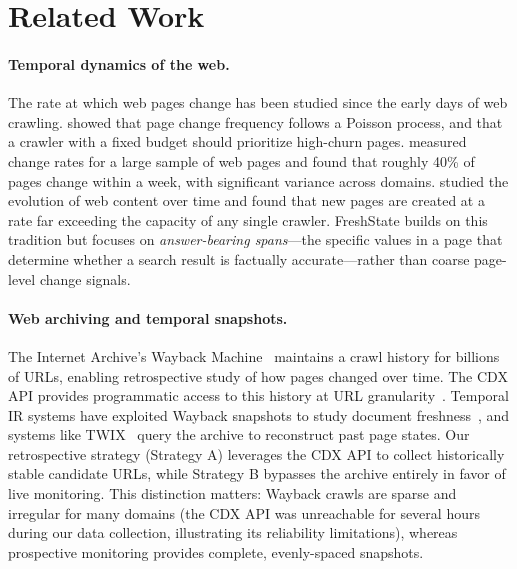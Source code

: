 \section{Related Work}
\label{sec:related}

\paragraph{Temporal dynamics of the web.}
The rate at which web pages change has been studied since the early days of web
crawling. \citet{cho2003estimating} showed that page change frequency follows a
Poisson process, and that a crawler with a fixed budget should prioritize
high-churn pages. \citet{fetterly2003evolution} measured change rates for a
large sample of web pages and found that roughly 40\% of pages change within a
week, with significant variance across domains. \citet{ntoulas2004s} studied the
evolution of web content over time and found that new pages are created at a rate
far exceeding the capacity of any single crawler. FreshState builds on this
tradition but focuses on \emph{answer-bearing spans}---the specific values in a
page that determine whether a search result is factually accurate---rather than
coarse page-level change signals.

\paragraph{Web archiving and temporal snapshots.}
The Internet Archive's Wayback Machine~\citep{internetarchive} maintains a crawl
history for billions of URLs, enabling retrospective study of how pages changed
over time. The CDX API provides programmatic access to this history at URL
granularity~\citep{cdxapi}. Temporal IR systems have exploited Wayback snapshots
to study document freshness~\citep{joho2013temporalir}, and systems like
TWIX~\citep{whiting2013twix} query the archive to reconstruct past page states.
Our retrospective strategy (Strategy A) leverages the CDX API to collect
historically stable candidate URLs, while Strategy B bypasses the archive entirely
in favor of live monitoring. This distinction matters: Wayback crawls are sparse and
irregular for many domains (the CDX API was unreachable for several hours during our
data collection, illustrating its reliability limitations), whereas prospective
monitoring provides complete, evenly-spaced snapshots.

